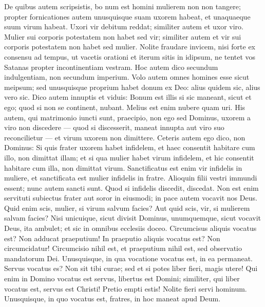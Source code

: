 \begin{biblechapter}
\begin{biblechapter}
\begin{biblechapter}
\begin{biblechapter}
\begin{biblechapter}
\begin{biblechapter}
\begin{biblechapter}
\verse De quibus autem scripsistis, bo num est homini mulierem non non tangere; 
\verse propter fornicationes autem unusquisque suam uxorem habeat, et unaquaeque suum virum habeat.
 \verse Uxori vir debitum reddat; similiter autem et uxor viro. 
\verse Mulier sui corporis potestatem non habet sed vir; similiter autem et vir sui corporis potestatem non habet sed mulier. 
\verse Nolite fraudare invicem, nisi forte ex consensu ad tempus, ut vacetis orationi et iterum sitis in idipsum, ne tentet vos Satanas propter incontinentiam vestram. 
\verse Hoc autem dico secundum indulgentiam, non secundum imperium. 
\verse Volo autem omnes homines esse sicut meipsum; sed unusquisque proprium habet donum ex Deo: alius quidem sic, alius vero sic.
 \verse Dico autem innuptis et viduis: Bonum est illis si sic maneant, sicut et ego; 
 \verse quod si non se continent, nubant. Melius est enim nubere quam uri.
 \verse His autem, qui matrimonio iuncti sunt, praecipio, non ego sed Dominus, uxorem a viro non discedere 
\verse — quod si discesserit, maneat innupta aut viro suo reconcilietur — et virum uxorem non dimittere.
 \verse Ceteris autem ego dico, non Dominus: Si quis frater uxorem habet infidelem, et haec consentit habitare cum illo, non dimittat illam; 
\verse et si qua mulier habet virum infidelem, et hic consentit habitare cum illa, non dimittat virum. 
\verse Sanctificatus est enim vir infidelis in muliere, et sanctificata est mulier infidelis in fratre. Alioquin filii vestri immundi essent; nunc autem sancti sunt. 
\verse Quod si infidelis discedit, discedat. Non est enim servituti subiectus frater aut soror in eiusmodi; in pace autem vocavit nos Deus. 
\verse Quid enim scis, mulier, si virum salvum facies? Aut quid scis, vir, si mulierem salvam facies?
 \verse Nisi unicuique, sicut divisit Dominus, unumquemque, sicut vocavit Deus, ita ambulet; et sic in omnibus ecclesiis doceo. 
\verse Circumcisus aliquis vocatus est? Non adducat praeputium! In praeputio aliquis vocatus est? Non circumcidatur! 
\verse Circumcisio nihil est, et praeputium nihil est, sed observatio mandatorum Dei. 
\verse Unusquisque, in qua vocatione vocatus est, in ea permaneat. 
\verse Servus vocatus es? Non sit tibi curae; sed et si potes liber fieri, magis utere! 
\verse Qui enim in Domino vocatus est servus, libertus est Domini; similiter, qui liber vocatus est, servus est Christi! 
\verse Pretio empti estis! Nolite fieri servi hominum. 
\verse Unusquisque, in quo vocatus est, fratres, in hoc maneat apud Deum.
 

\end{biblechapter}
\end{biblechapter}
\end{biblechapter}
\end{biblechapter}
\end{biblechapter}
\end{biblechapter}
\end{biblechapter}
